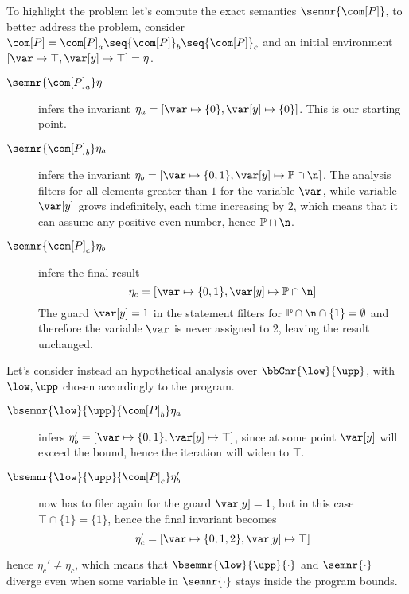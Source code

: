 To highlight the problem let's compute the exact semantics
\(\semnr{\com[P]}\), to better address the problem, consider
\(\com[P] = {\com[P]}_a\seq {\com[P]}_b \seq {\com[P]}_c\) and an
initial environment \([\var\mapsto\top,\var[y]\mapsto\top] = \eta\).
\begin{description}
\item[\(\semnr{{\com[P]}_a}\eta\)] infers the invariant
  \(\eta_a = [\var\mapsto \{0\}, \var[y]\mapsto\{0\}]\). This is our
  starting point.
\item[\(\semnr{{\com[P]}_b}\eta_a\)] infers the invariant
  \(\eta_b = [\var\mapsto\{0,1\},
  \var[y]\mapsto\mathbb{P}\cap\n]\). The analysis filters for all
  elements greater than \(1\) for the variable \(\var\), while
  variable \(\var[y]\) grows indefinitely, each time increasing by
  \(2\), which means that it can assume any positive even number,
  hence \(\mathbb{P} \cap \n\).
\item[\(\semnr{{\com[P]}_c}\eta_b\)] infers the final result
  \begin{equation*}
    \eta_c = [\var\mapsto\{0,1\}, \var[y]\mapsto\mathbb{P}\cap\n]
  \end{equation*}
  The guard \(\var[y] = 1\) in the  statement filters for
  \(\mathbb{P}\cap\n\cap\{1\} = \emptyset\) and therefore the variable
  \(\var\) is never assigned to 2, leaving the result unchanged.
\end{description}

Let's consider instead an hypothetical analysis over
\(\bbCnr{\low}{\upp}\), with \(\low,\upp\) chosen accordingly to the
program.
\begin{description}
\item[\(\bsemnr{\low}{\upp}{{\com[P]}_b}\eta_a\)] infers
  \(\eta_b' = [\var\mapsto\{0,1\}, \var[y]\mapsto\top]\), since at
  some point \(\var[y]\) will exceed the bound, hence the iteration
  will widen to \(\top\).
  
\item[\(\bsemnr{\low}{\upp}{{\com[P]}_c}\eta_b'\)] now has to filer
  again for the guard \(\var[y] = 1\), but in this case
  \(\top \cap \{1\} = \{1\}\), hence the final invariant becomes
  \begin{equation*}
    \eta_c' = [\var\mapsto\{0,1,2\}, \var[y] \mapsto \top]
  \end{equation*}
\end{description}
hence \(\eta_c'\neq\eta_c\), which means that
\(\bsemnr{\low}{\upp}{\cdot}\) and \(\semnr{\cdot}\) diverge even when
some variable in \(\semnr{\cdot}\) stays inside the program bounds.


